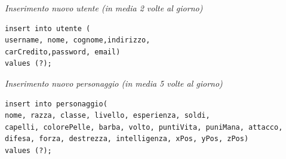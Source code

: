 \noindent\textit{Inserimento nuovo utente (in media 2 volte al giorno)}
\begin{verbatim}
insert into utente (
username, nome, cognome,indirizzo,
carCredito,password, email)
values (?);
\end{verbatim}
\vspace{0.5cm}

\noindent{}
\newline\newline

\noindent\textit{Inserimento nuovo personaggio (in media 5 volte al giorno)}
\begin{verbatim}insert into personaggio(
nome, razza, classe, livello, esperienza, soldi,
capelli, colorePelle, barba, volto, puntiVita, puniMana, attacco,
difesa, forza, destrezza, intelligenza, xPos, yPos, zPos)
values (?);

\end{verbatim}
